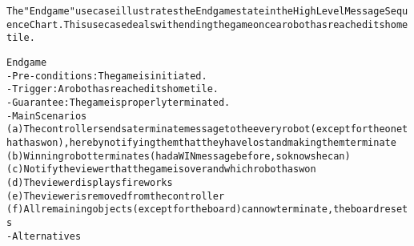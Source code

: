 \begin{alltt}
The "End game" use case illustrates the End game state in the High Level Message Sequence Chart. This use case deals with ending the game once a robot has reached its home tile.

End game
- Pre-conditions: The game is initiated.
- Trigger:  A robot has reached its home tile.
- Guarantee: The game is properly terminated.
- Main Scenarios
    (a) The controller sends a terminate message to the every robot (except for the one that has won), hereby notifying them that they have lost and making them terminate
    (b) Winning robot terminates (had a WIN message before, so knows he can)
    (c) Notify the viewer that the game is over and which robot has won
    (d) The viewer displays fireworks
    (e) The viewer is removed from the controller
    (f) All remaining objects (except for the board) can now terminate, the board resets
- Alternatives

\end{alltt}
